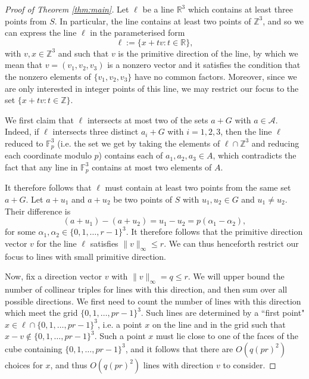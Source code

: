 \documentclass[11pt]{amsart}
\newcommand{\cA}{\mathcal{A}}
\theoremstyle{remark}
\begin{document}
\begin{proof}[Proof of Theorem \ref{thm:main}]
Let $\ell$ be a line $\mathbb R^3$ which contains at least three points from $S$. In particular, the line contains at least two points of $\mathbb Z^3$, and so we can express the line $\ell$ in the parameterised form
\[
\ell:= \{ x+tv : t \in \mathbb R \},
\]
with $v,x \in \mathbb Z^3$ and such that $v$ is the primitive direction of the line, by which we mean that $v=(v_1,v_2,v_3)$ is a nonzero vector and it satisfies the condition that the nonzero elements of $\{v_1,v_2,v_3\}$ have no common factors. Moreover, since we are only interested in integer points of this line, we may restrict our focus to the set $\{x+tv:t \in \mathbb Z \}$.

We first claim that $\ell$ intersects at most two of the sets $a+G$ with $a \in \cA$. Indeed, if $\ell$ intersects three distinct $a_i+G$ with $i=1,2,3$, then the line $\ell$ reduced to $\mathbb F_p^3$ (i.e. the set we get by taking the elements of $\ell \cap \mathbb Z^3$ and reducing each coordinate modulo $p$) contains each of $a_1, a_2,a_3 \in A$, which contradicts the fact that any line in $\mathbb F_p^3$ contains at most two elements of $A$.

It therefore follows that $\ell$ must contain at least two points from the same set $a+G$. Let $a+u_1$ and $a+u_2$ be two points of $S$ with $u_1,u_2 \in G$ and $u_1 \neq u_2$. Their difference is
\[
(a+u_1)-(a+u_2)=u_1-u_2=p(\alpha_1-\alpha_2),
\]
for some $\alpha_1,\alpha_2 \in \{0,1,\dots,r-1 \}^3$. It therefore follows that the primitive direction vector $v$ for the line $\ell$ satisfies $\|v\|_{\infty} \leq r$. We can thus henceforth restrict our focus to lines with small primitive direction.

Now, fix a direction vector $v$ with $\|v \|_{\infty}=q \leq r$. We will upper bound the number of collinear triples for lines with this direction, and then sum over all possible directions. We first need to count the number of lines with this direction which meet the grid $\{0,1,\dots, pr-1\}^3$. Such lines are determined by a ``first point" $x \in \ell \cap \{0,1,\dots, pr-1\}^3$, i.e. a point $x$ on the line and in the grid such that $x-v \notin \{0,1,\dots, pr-1\}^3$. Such a point $x$ must lie close to one of the faces of the cube containing $\{0,1,\dots, pr-1\}^3$, and it follows that there are $O(q(pr)^2)$ choices for $x$, and thus $O(q(pr)^2)$ lines with direction $v$ to consider.


\end{proof}
\end{document}

